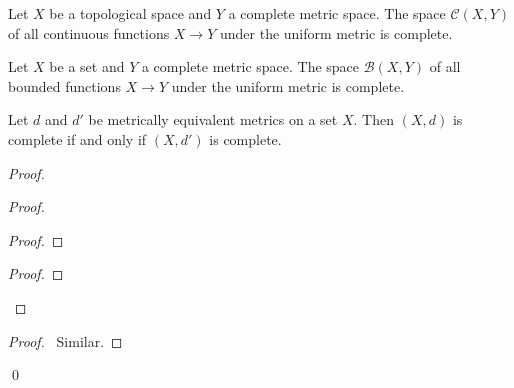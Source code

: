 \begin{proposition}
    Let $X$ be a topological space and $Y$ a complete metric space. The space $\mathcal{C}(X,Y)$ of all continuous functions
    $X \rightarrow Y$ under the uniform metric is complete.
\end{proposition}

\begin{corollary}
    Let $X$ be a set and $Y$ a complete metric space. The space $\mathcal{B}(X,Y)$ of all bounded functions $X \rightarrow Y$
    under the uniform metric is complete.
\end{corollary}

\begin{proposition}
    Let $d$ and $d'$ be metrically equivalent metrics on a set $X$. Then $(X,d)$ is complete if and only if $(X,d')$
    is complete.
\end{proposition}

\begin{proof}
    \pf
    \begin{proof}
        \begin{proof}
        \end{proof}
        \begin{proof}
        \end{proof}
    \end{proof}
    \begin{proof}
        \pf\ Similar.
    \end{proof}
    \qed
\end{proof}

